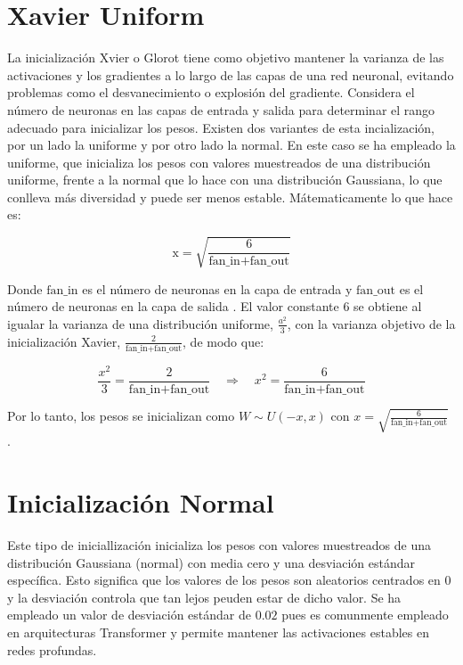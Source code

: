 \documentclass[11pt]{book}
\begin{document}
\section{Xavier Uniform} \label{sec:xavier}

La inicialización Xvier o Glorot tiene como objetivo mantener la varianza de las activaciones y los gradientes a lo largo de las capas de una red neuronal, evitando problemas como el desvanecimiento o explosión del gradiente. Considera el número de neuronas en las capas de entrada y salida para determinar el rango adecuado para inicializar los pesos. Existen dos variantes de esta incialización, por un lado la uniforme y por otro lado la normal. En este caso se ha empleado la uniforme, que inicializa los pesos con valores muestreados de una distribución uniforme, frente a la normal que lo hace con una distribución Gaussiana, lo que conlleva más diversidad y puede ser menos estable. Mátematicamente lo que hace es:

\[
\text{x} = \sqrt{\frac{6}{\text{fan\_in} + \text{fan\_out}}}
\]

Donde $\text{fan\_in}$ es el número de neuronas en la capa de entrada y $\text{fan\_out}$ es el número de neuronas en la capa de salida \parencite{codesignal_xavier_uniform_pytorch}. El valor constante $6$ se obtiene al igualar la varianza de una distribución uniforme, $\frac{a^2}{3}$, con la varianza objetivo de la inicialización Xavier, $\frac{2}{\text{fan\_in} + \text{fan\_out}}$, de modo que:

\[
\frac{x^2}{3} = \frac{2}{\text{fan\_in} + \text{fan\_out}} \quad \Rightarrow \quad x^2 = \frac{6}{\text{fan\_in} + \text{fan\_out}}
\]

Por lo tanto, los pesos se inicializan como $W \sim U(-x, x)$ con $x = \sqrt{\frac{6}{\text{fan\_in} + \text{fan\_out}}}$ \parencite{365datascience_xavier_init}.


\section{Inicialización Normal} \label{sec:normal}

Este tipo de iniciallización inicializa los pesos con valores muestreados de una distribución Gaussiana (normal) con media cero y una desviación estándar específica. Esto significa que los valores de los pesos son aleatorios centrados en $0$ y la desviación controla que tan lejos peuden estar de dicho valor. Se ha empleado un valor de desviación estándar de $0.02$ pues es comunmente empleado en arquitecturas Transformer y permite mantener las activaciones estables en redes profundas.
\end{document}
